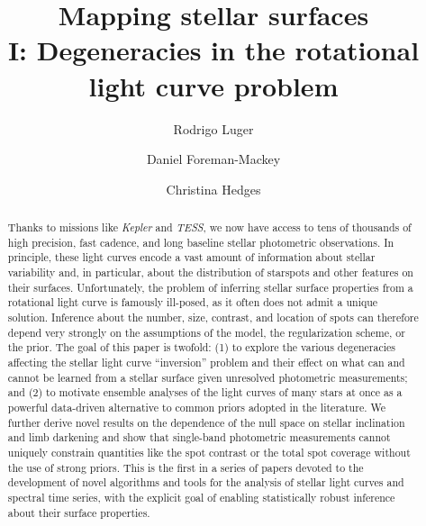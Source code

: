 \documentclass[modern]{aastex62}
\begin{document}
\title{%
    \textbf{
        Mapping stellar surfaces\\
        I: Degeneracies in the rotational light curve problem
    }
}

\author[0000-0002-0296-3826]{Rodrigo Luger}
%
\author[0000-0002-9328-5652]{Daniel Foreman-Mackey}
%
\author[0000-0002-3385-8391]{Christina Hedges}
%



\begin{abstract}
    Thanks to missions like \emph{Kepler} and \emph{TESS}, we now
    have access to tens of thousands of high precision, fast
    cadence, and long baseline stellar photometric observations.
    In principle, these light curves encode a vast amount of information about
    stellar variability and, in particular, about the distribution of
    starspots and other features on their surfaces.
    Unfortunately, the problem of inferring stellar surface properties
    from a rotational light curve is famously ill-posed,
    as it often does not admit a unique solution.
    Inference about the number, size, contrast, and location of spots
    can therefore depend very strongly on the assumptions of the model,
    the regularization scheme, or the prior.
    The goal of this paper is twofold:
    (1) to explore the various degeneracies affecting the stellar
    light curve ``inversion'' problem and their effect on
    what can and cannot be learned from a stellar surface
    given unresolved photometric measurements; and
    (2) to motivate ensemble analyses of the light curves of
    many stars at once as a powerful data-driven alternative to common
    priors adopted in the literature.
    We further derive novel results on the dependence of the null space
    on stellar inclination and limb darkening and
    show that single-band photometric measurements cannot uniquely
    constrain quantities like the spot contrast or the total
    spot coverage without the use of strong priors.
    This is the first in a series of papers devoted to the development
    of novel algorithms and tools for the analysis of
    stellar light curves and spectral time series, with the
    explicit goal of enabling statistically robust inference
    about their surface properties.
\end{abstract}
\end{document}

